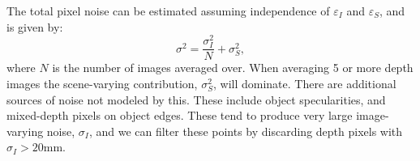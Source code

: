 The total pixel noise can be estimated assuming independence of $\varepsilon_I$ and $\varepsilon_S$, and is given by:
\begin{equation}
\sigma^2 = \frac{\sigma_I^2}{N} + \sigma_S^2,\label{eq:sigma}
\end{equation}
where $N$ is the number of images averaged over.  When averaging 5 or more depth images the scene-varying contribution, $\sigma_S^2$, will dominate.  There are additional sources of noise not modeled by this.  These include object specularities, and mixed-depth pixels on object edges.  These tend to produce very large image-varying noise, $\sigma_I$, and we can filter these points by discarding depth pixels with $\sigma_I>20$mm.  



